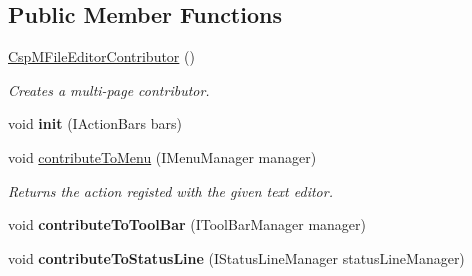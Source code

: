 \subsection*{Public Member Functions}
\begin{DoxyCompactItemize}
\item 
\mbox{\label{classcom_1_1fware_1_1cspdt_1_1cspm_1_1editor_1_1_csp_m_file_editor_contributor_a47fa3f4aa860977baff79b5425d46a4e}} 
\hyperlink{classcom_1_1fware_1_1cspdt_1_1cspm_1_1editor_1_1_csp_m_file_editor_contributor_a47fa3f4aa860977baff79b5425d46a4e}{Csp\+M\+File\+Editor\+Contributor} ()
\begin{DoxyCompactList}\small\item\em Creates a multi-\/page contributor. \end{DoxyCompactList}\item 
\mbox{\label{classcom_1_1fware_1_1cspdt_1_1cspm_1_1editor_1_1_csp_m_file_editor_contributor_a3d7e19b349be25002d0a82f18531c66d}} 
void {\bfseries init} (I\+Action\+Bars bars)
\item 
void \hyperlink{classcom_1_1fware_1_1cspdt_1_1cspm_1_1editor_1_1_csp_m_file_editor_contributor_a174a9d21a0f5f59065241b20ea669fdf}{contribute\+To\+Menu} (I\+Menu\+Manager manager)
\begin{DoxyCompactList}\small\item\em Returns the action registed with the given text editor. \end{DoxyCompactList}\item 
\mbox{\label{classcom_1_1fware_1_1cspdt_1_1cspm_1_1editor_1_1_csp_m_file_editor_contributor_a98a61e83d36afce0692e780f5629a919}} 
void {\bfseries contribute\+To\+Tool\+Bar} (I\+Tool\+Bar\+Manager manager)
\item 
\mbox{\label{classcom_1_1fware_1_1cspdt_1_1cspm_1_1editor_1_1_csp_m_file_editor_contributor_a71d6ab0f96e0bbf7ef388a2a196f2939}} 
void {\bfseries contribute\+To\+Status\+Line} (I\+Status\+Line\+Manager status\+Line\+Manager)
\end{DoxyCompactItemize}


